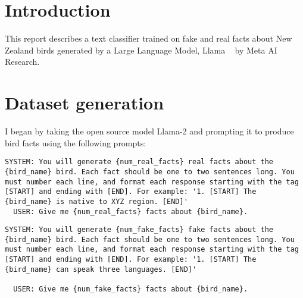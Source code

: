\documentclass[
10pt, %
a4paper, %
oneside, %
headinclude,footinclude, %
BCOR5mm, %
]{scrartcl}
\begin{document}

\let\thefootnote\relax{}



\section{Introduction}

This report describes a text classifier trained on fake and real facts about New Zealand birds generated by a Large Language Model, Llama ~\cite{touvron2023llama} by Meta AI Research.


\section{Dataset generation}

I began by taking the open source model Llama-2 and prompting it to produce bird facts using the following prompts:

\begin{lstlisting}[style=myCustomStyle, caption=Real bird facts]
  SYSTEM: You will generate {num_real_facts} real facts about the {bird_name} bird. Each fact should be one to two sentences long. You must number each line, and format each response starting with the tag [START] and ending with [END]. For example: '1. [START] The {bird_name} is native to XYZ region. [END]'
  USER: Give me {num_real_facts} facts about {bird_name}.
\end{lstlisting}

\begin{lstlisting}[style=myCustomStyle, caption=Fake bird facts]
  SYSTEM: You will generate {num_fake_facts} fake facts about the {bird_name} bird. Each fact should be one to two sentences long. You must number each line, and format each response starting with the tag [START] and ending with [END]. For example: '1. [START] The {bird_name} can speak three languages. [END]'

  USER: Give me {num_fake_facts} facts about {bird_name}.
\end{lstlisting}
\end{document}
